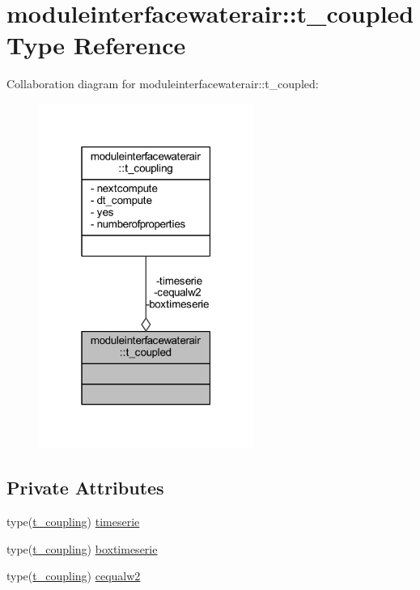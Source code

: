\hypertarget{structmoduleinterfacewaterair_1_1t__coupled}{}\section{moduleinterfacewaterair\+:\+:t\+\_\+coupled Type Reference}
\label{structmoduleinterfacewaterair_1_1t__coupled}


Collaboration diagram for moduleinterfacewaterair\+:\+:t\+\_\+coupled\+:\nopagebreak
\begin{figure}[H]
\begin{center}
\leavevmode
\includegraphics[width=199pt]{structmoduleinterfacewaterair_1_1t__coupled__coll__graph}
\end{center}
\end{figure}
\subsection*{Private Attributes}
\begin{DoxyCompactItemize}
\item 
type(\mbox{\hyperlink{structmoduleinterfacewaterair_1_1t__coupling}{t\+\_\+coupling}}) \mbox{\hyperlink{structmoduleinterfacewaterair_1_1t__coupled_adc3dc180a9f829ac901acbb92201529b}{timeserie}}
\item 
type(\mbox{\hyperlink{structmoduleinterfacewaterair_1_1t__coupling}{t\+\_\+coupling}}) \mbox{\hyperlink{structmoduleinterfacewaterair_1_1t__coupled_ae0b37dfd3c144fac7fc65bf66b840b0a}{boxtimeserie}}
\item 
type(\mbox{\hyperlink{structmoduleinterfacewaterair_1_1t__coupling}{t\+\_\+coupling}}) \mbox{\hyperlink{structmoduleinterfacewaterair_1_1t__coupled_a9a1d5d9475902c905ffa2d11c2f8d9f1}{cequalw2}}
\end{DoxyCompactItemize}


